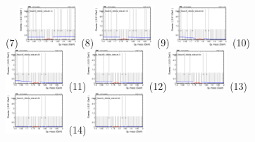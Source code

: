 \begin{figure}[h!]
        \subfigure(7){\includegraphics[width=0.2\textwidth]{power_law/plots/tauhA/massfit_tauhA_40bins_bdtcut0.14.png}}
        \subfigure(8){\includegraphics[width=0.2\textwidth]{power_law/plots/tauhA/massfit_tauhA_40bins_bdtcut0.18.png}}
        \subfigure(9){\includegraphics[width=0.2\textwidth]{power_law/plots/tauhA/massfit_tauhA_40bins_bdtcut0.22.png}}
        \subfigure(10){\includegraphics[width=0.2\textwidth]{power_law/plots/tauhA/massfit_tauhA_40bins_bdtcut0.26.png}}
        \subfigure(11){\includegraphics[width=0.2\textwidth]{power_law/plots/tauhA/massfit_tauhA_40bins_bdtcut0.3.png}}
        \subfigure(12){\includegraphics[width=0.2\textwidth]{power_law/plots/tauhA/massfit_tauhA_40bins_bdtcut0.34.png}}
        \subfigure(13){\includegraphics[width=0.2\textwidth]{power_law/plots/tauhA/massfit_tauhA_40bins_bdtcut0.38.png}}
        \subfigure(14){\includegraphics[width=0.2\textwidth]{power_law/plots/tauhA/massfit_tauhA_40bins_bdtcut0.42.png}}

\end{figure}

